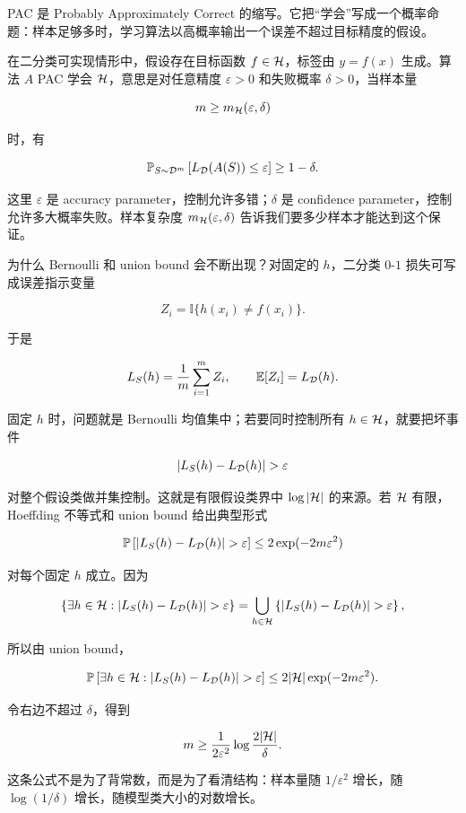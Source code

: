 PAC 是 Probably Approximately Correct 的缩写。它把“学会”写成一个概率命题：样本足够多时，学习算法以高概率输出一个误差不超过目标精度的假设。

在二分类可实现情形中，假设存在目标函数 \(f\in\mathcal{H}\)，标签由 \(y=f(x)\) 生成。算法 \(A\) PAC 学会 \(\mathcal{H}\)，意思是对任意精度 \(\varepsilon>0\) 和失败概率 \(\delta>0\)，当样本量

\[
  m\ge m_{\mathcal{H}}(\varepsilon,\delta)
\]

时，有

\[
  \mathbb{P}_{S\sim \mathcal{D}^m}
  \left[
    L_{\mathcal{D}}(A(S))\le \varepsilon
  \right]
  \ge 1-\delta.
\]

这里 \(\varepsilon\) 是 accuracy parameter，控制允许多错；\(\delta\) 是 confidence parameter，控制允许多大概率失败。样本复杂度 \(m_{\mathcal{H}}(\varepsilon,\delta)\) 告诉我们要多少样本才能达到这个保证。

为什么 Bernoulli 和 union bound 会不断出现？对固定的 \(h\)，二分类 \(0\)-\(1\) 损失可写成误差指示变量

\[
  Z_i=\mathbb{I}\{h(x_i)\ne f(x_i)\}.
\]

于是

\[
  L_S(h)=\frac1m\sum_{i=1}^{m}Z_i,
  \qquad
  \mathbb{E}[Z_i]=L_{\mathcal{D}}(h).
\]

固定 \(h\) 时，问题就是 Bernoulli 均值集中；若要同时控制所有 \(h\in\mathcal{H}\)，就要把坏事件

\[
  \left|L_S(h)-L_{\Dcal}(h)\right|>\varepsilon
\]

对整个假设类做并集控制。这就是有限假设类界中 \(\log|\mathcal{H}|\) 的来源。若 \(\mathcal{H}\) 有限，Hoeffding 不等式和 union bound 给出典型形式

\[
  \Pbb\left[
    |L_S(h)-L_{\Dcal}(h)|>\varepsilon
  \right]
  \le
  2\exp(-2m\varepsilon^2)
\]

对每个固定 \(h\) 成立。因为

\[
  \left\{
    \exists h\in\Hcal:
    |L_S(h)-L_{\Dcal}(h)|>\varepsilon
  \right\}
  =
  \bigcup_{h\in\Hcal}
  \left\{
    |L_S(h)-L_{\Dcal}(h)|>\varepsilon
  \right\},
\]

所以由 union bound，

\[
  \Pbb\left[
    \exists h\in\Hcal:
    |L_S(h)-L_{\Dcal}(h)|>\varepsilon
  \right]
  \le
  2|\Hcal|\exp(-2m\varepsilon^2).
\]

令右边不超过 \(\delta\)，得到

\[
  m
  \ge
  \frac{1}{2\varepsilon^2}
  \log\frac{2|\mathcal{H}|}{\delta}.
\]

这条公式不是为了背常数，而是为了看清结构：样本量随 \(1/\varepsilon^2\) 增长，随 \(\log(1/\delta)\) 增长，随模型类大小的对数增长。

